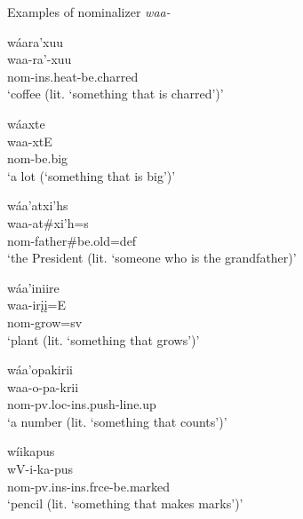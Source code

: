 \begin{exe}

\item\label{ExNomWAA} Examples of nominalizer \textit{waa-} 

	\begin{xlist}
	
	\item \glll wáara'xuu\\
	waa-ra'-xuu\\
	nom-ins.heat-\textnormal{be.charred}\\
	\glt `coffee (lit. `something that is charred')' \citep[330]{hollow1970}
	
	\item \glll wáaxte\\
	waa-xtE\\
	nom-\textnormal{be.big}\\
	\glt `a lot (`something that is big')' \citep[328]{hollow1970}
	
	\item \glll wáa'atxi'hs\\
	waa-at\#xi'h=s\\
	nom-\textnormal{father}\#\textnormal{be.old}=def\\
	\glt `the President (lit. `someone who is the grandfather)' \citep[61]{hollow1970}
	
	\item \glll wáa'iniire\\
	waa-irįį=E\\
	nom-\textnormal{grow}=sv\\
	\glt `plant (lit. `something that grows')' \citep[62]{hollow1970}
	
	\item \glll wáa'opakirii\\
	waa-o-pa-krii\\
	nom-pv.loc-ins.push-\textnormal{line.up}\\
	\glt `a number (lit. `something that counts')' \citep[119]{hollow1970}
	
	\item \glll wíikapus\\
	wV-i-ka-pus\\
	nom-pv.ins-ins.frce-\textnormal{be.marked}\\
	\glt 	`pencil (lit. `something that makes marks')' \citep[77]{hollow1970}
	
	\end{xlist}

\end{exe}

